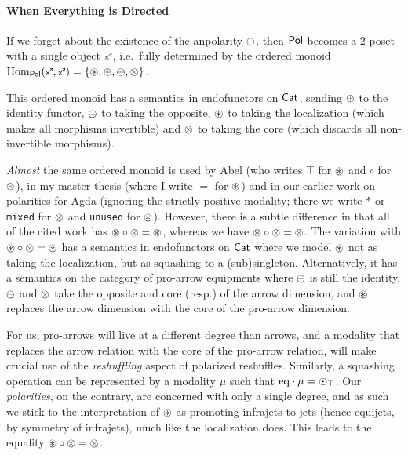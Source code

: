 \documentclass[a4paper]{memoir}
\begin{document}
\paragraph{When Everything is Directed}
If we forget about the existence of the anpolarity $\npolar$, then ${\mathsf{Pol}}$ becomes a 2-poset with a single object $\ypolar$, i.e.\ fully determined by the ordered monoid $\Hom_\polcat(\ypolar, \ypolar) = \accol{\isopol, \pospol, \negpol, \mixpol}$.

This ordered monoid has a semantics in endofunctors on ${\mathsf{Cat}}$, sending ${\oplus}$ to the identity functor, ${\ominus}$ to taking the opposite, ${\oast}$ to taking the localization (which makes all morphisms invertible) and ${\otimes}$ to taking the core (which discards all non-invertible morphisms).

\emph{Almost} the same ordered monoid is used by Abel \cite{abel-polarized} (who writes $\top$ for ${\oast}$ and $\circ$ for ${\otimes}$),
in my master thesis \cite{nuyts-phd} (where I write $=$ for ${\oast}$)
and in our earlier work on polarities for Agda \cite{abstract-agda-polarities} (ignoring the strictly positive modality; there we write $*$ or \texttt{mixed} for ${\otimes}$ and \texttt{unused} for ${\oast}$).
However, there is a subtle difference in that all of the cited work has ${\oast} \circ {\otimes} = {\oast}$, whereas we have ${\oast} \circ {\otimes} = {\otimes}$.
The variation with ${\oast} \circ {\otimes} = {\oast}$ has a semantics in endofunctors on ${\mathsf{Cat}}$ where we model ${\oast}$ not as taking the localization, but as squashing to a (sub)singleton.
Alternatively, it has a semantics on the category of pro-arrow equipments \cite{nlab:proarrow,proarrow1,proarrow2} where ${\oplus}$ is still the identity, ${\ominus}$ and ${\otimes}$ take the opposite and core (resp.) of the arrow dimension, and ${\oast}$ replaces the arrow dimension with the core of the pro-arrow dimension.

For us, pro-arrows will live at a different degree than arrows, and a modality that replaces the arrow relation with the core of the pro-arrow relation, will make crucial use of the \emph{reshuffling} aspect of polarized reshuffles.
Similarly, a squashing operation can be represented by a modality $\mu$ such that ${\mathrm{eq}} \cdot \mu = {\odot}_\top$.
Our \emph{polarities}, on the contrary, are concerned with only a single degree, and as such we stick to the interpretation of ${\oast}$ as promoting infrajets to jets (hence equijets, by symmetry of infrajets), much like the localization does.
This leads to the equality ${\oast} \circ {\otimes} = {\otimes}$.
\end{document}
